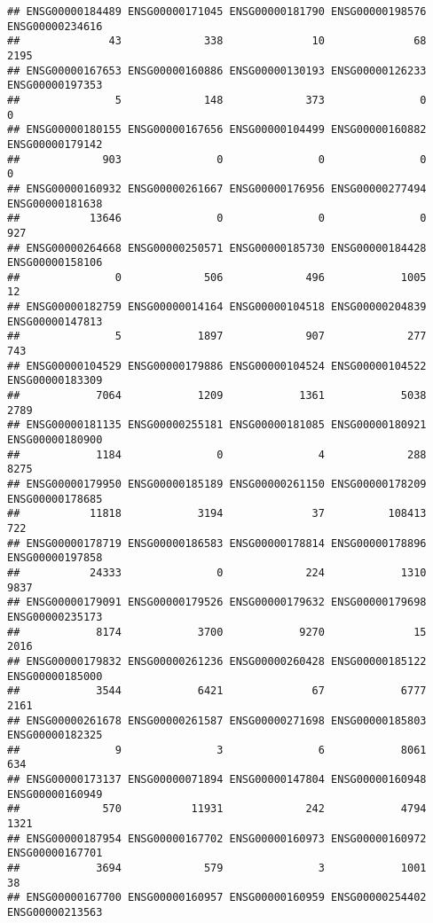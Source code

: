 \documentclass[
]{article}
\begin{document}
\begin{verbatim}
## ENSG00000184489 ENSG00000171045 ENSG00000181790 ENSG00000198576 ENSG00000234616 
##              43             338              10              68            2195 
## ENSG00000167653 ENSG00000160886 ENSG00000130193 ENSG00000126233 ENSG00000197353 
##               5             148             373               0               0 
## ENSG00000180155 ENSG00000167656 ENSG00000104499 ENSG00000160882 ENSG00000179142 
##             903               0               0               0               0 
## ENSG00000160932 ENSG00000261667 ENSG00000176956 ENSG00000277494 ENSG00000181638 
##           13646               0               0               0             927 
## ENSG00000264668 ENSG00000250571 ENSG00000185730 ENSG00000184428 ENSG00000158106 
##               0             506             496            1005              12 
## ENSG00000182759 ENSG00000014164 ENSG00000104518 ENSG00000204839 ENSG00000147813 
##               5            1897             907             277             743 
## ENSG00000104529 ENSG00000179886 ENSG00000104524 ENSG00000104522 ENSG00000183309 
##            7064            1209            1361            5038            2789 
## ENSG00000181135 ENSG00000255181 ENSG00000181085 ENSG00000180921 ENSG00000180900 
##            1184               0               4             288            8275 
## ENSG00000179950 ENSG00000185189 ENSG00000261150 ENSG00000178209 ENSG00000178685 
##           11818            3194              37          108413             722 
## ENSG00000178719 ENSG00000186583 ENSG00000178814 ENSG00000178896 ENSG00000197858 
##           24333               0             224            1310            9837 
## ENSG00000179091 ENSG00000179526 ENSG00000179632 ENSG00000179698 ENSG00000235173 
##            8174            3700            9270              15            2016 
## ENSG00000179832 ENSG00000261236 ENSG00000260428 ENSG00000185122 ENSG00000185000 
##            3544            6421              67            6777            2161 
## ENSG00000261678 ENSG00000261587 ENSG00000271698 ENSG00000185803 ENSG00000182325 
##               9               3               6            8061             634 
## ENSG00000173137 ENSG00000071894 ENSG00000147804 ENSG00000160948 ENSG00000160949 
##             570           11931             242            4794            1321 
## ENSG00000187954 ENSG00000167702 ENSG00000160973 ENSG00000160972 ENSG00000167701 
##            3694             579               3            1001              38 
## ENSG00000167700 ENSG00000160957 ENSG00000160959 ENSG00000254402 ENSG00000213563 

\end{verbatim}
\end{document}
